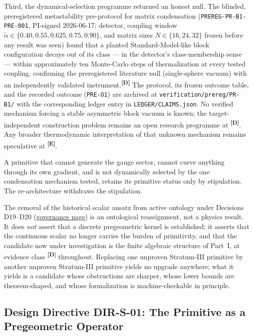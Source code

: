 \documentclass[12pt,a4paper,twoside]{article}
\theoremstyle{plain}
\theoremstyle{definition}
\theoremstyle{remark}
\newcommand{\catmark}[1]{\textsuperscript{\textsf{\textbf{[#1]}}}}
\begin{document}
Third, the dynamical-selection programme returned an honest null. The
blinded, preregistered metastability pre-protocol for matrix condensation
(\texttt{PREREG-PR-B1-PRE-001}, PI-signed 2026-06-17; detector, coupling
window $\tilde\alpha \in \{0.40, 0.55, 0.625, 0.75, 0.90\}$, and matrix
sizes $N \in \{16, 24, 32\}$ frozen before any result was seen) found
that a planted Standard-Model-like block configuration decays out of its
class --- in the detector's class-membership sense --- within
approximately ten Monte-Carlo steps of thermalization at every tested
coupling, confirming the preregistered literature null (single-sphere
vacuum) with an independently validated instrument.\catmark{D} The
protocol, its frozen outcome table, and the recorded outcome
(\texttt{PRE-O1}) are archived at \texttt{verification/prereg/PR-B1/}
with the corresponding ledger entry in \texttt{LEDGER/CLAIMS.json}. No verified mechanism forcing a stable asymmetric block vacuum is known;
the target-independent construction problem remains an open research
programme at \catmark{D}. Any broader thermodynamic interpretation of that
unknown mechanism remains speculative at \catmark{E}.

A primitive that cannot generate the gauge sector, cannot curve anything
through its own gradient, and is not dynamically selected by the one
condensation mechanism tested, retains its primitive status only by
stipulation. The re-architecture withdraws the stipulation.

\begin{pioverridebox}
The removal of the historical scalar ansatz from active ontology under Decisions D19--D20
(\hyperref[box:pi-decision-d20]{governance page}) is an ontological reassignment, not a physics
result. It does \emph{not} assert that a discrete pregeometric kernel is
established; it asserts that the continuous scalar no longer carries the
burden of primitivity, and that the candidate now under investigation is
the finite algebraic structure of Part~I, at evidence class \catmark{D}
throughout. Replacing one unproven Stratum-III primitive by another
unproven Stratum-III primitive yields no upgrade anywhere; what it yields
is a candidate whose obstructions are sharper, whose lower bounds are
theorem-shaped, and whose formalization is machine-checkable in principle.
\end{pioverridebox}

\subsection{Design Directive DIR-S-01: The Primitive as a Pregeometric Operator}
\label{subsec:dir-s-01}
\end{document}
